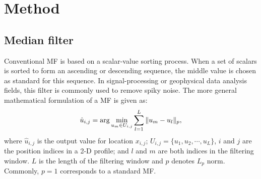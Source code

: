 
\section{Method}
\subsection{Median filter}
Conventional MF is based on a scalar-value sorting process. When a set of scalars is sorted to form an ascending or descending sequence, the middle value is chosen as standard for this sequence. In signal-processing or geophysical data analysis fields, this filter is commonly used to remove spiky noise. The more general mathematical formulation of a MF is given as:
\begin{equation}
\label{eq:mf1}
\hat{u}_{i,j}=\arg\min_{u_m\in U_{i,j}}\sum_{l=1}^{L}\Arrowvert u_m-u_l \Arrowvert_p,
\end{equation}
where $\hat{u}_{i,j}$ is the output value for location $x_{i,j}$; $U_{i,j}=\{u_1,u_2,\cdots,u_L\}$, $i$ and $j$ are the position indices in a 2-D profile; and $l$ and $m$ are both indices in the filtering window. $L$ is the length of the filtering window and $p$ denotes $L_p$ norm. Commonly, $p=1$ corresponds to a standard MF. 

